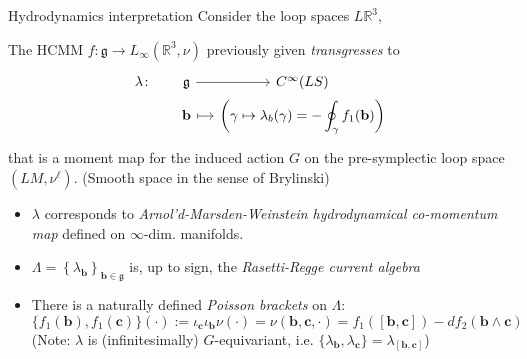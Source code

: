 \documentclass[handout,10pt]{beamer}
\begin{document}
\begin{frame}[fragile]{Hydrodynamics interpretation}\label{frame:hydrointerpretation}
		Consider the loop spaces $L{\mathbb R}^3$,\\
		\begin{propblock}
			The HCMM $f \colon \mathfrak{g} \to L_{\infty}(\mathbb{R}^3,\nu)$ previously given
			\emph{transgresses}	 to
			\begin{displaymath}%
				\begin{tikzcd}[column sep= small,row sep=0ex]
					\lambda \colon& \mathfrak{g}	\arrow[r]& C^\infty(LS) \\
					& {\mathbf b}	\arrow[r, mapsto]
					& \displaystyle \biggr( \gamma \mapsto \lambda_b(\gamma) = - \oint_{\gamma} f_1({\mathbf b})  \biggr)	
				\end{tikzcd}	
			\end{displaymath}
			that is a  moment map for the induced action $G$ on the pre-symplectic loop space $(LM,\nu^{\ell})$. (Smooth space in the sense of Brylinski)
		\end{propblock}
		\begin{itemize}
			\item $\lambda$ corresponds to \emph{Arnol'd-Marsden-Weinstein hydrodynamical co-momentum map}  defined on $\infty$-dim. manifolds.
			\item<2-> $\Lambda = \left\lbrace \lambda_{\mathbf b} \right\rbrace_{{\mathbf b}\in\mathfrak{g}}$ is, up to sign, the {\it Rasetti-Regge current algebra}
			\item<3-> There is a naturally defined {\it Poisson brackets} on $\Lambda$:
				\begin{displaymath}
					\{ f_1({\mathbf b}), f_1({\mathbf c}) \} (\cdot):= \iota_{\mathbf c} \iota_{\mathbf b} \nu (\cdot)=
						\nu({\mathbf b}, {\mathbf c}, \cdot) = f_1([{\mathbf b},{\mathbf c}])
					-df_2 ({\mathbf b} \wedge {\mathbf c})
				\end{displaymath}
				\centering\footnotesize(Note: $\lambda$ is (infinitesimally) $G$-equivariant, i.e. $	\{\lambda_{\mathbf b}, \lambda_{\mathbf c} \} = \lambda_{[{\mathbf b}, {\mathbf c}]}$)
		\end{itemize}

    
\end{frame}
\end{document}
